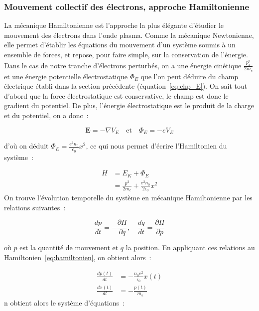 \documentclass[a4paper]{book}
\begin{document}
\subsubsection{Mouvement collectif des électrons, approche Hamiltonienne}

La mécanique Hamiltonienne est l'approche la plus élégante d'étudier le mouvement des électrons dans l'onde plasma. Comme la mécanique Newtonienne, elle permet d'établir les équations du mouvement d'un système soumis à un ensemble de forces, et repose, pour faire simple, sur la conservation de l'énergie. Dans le cas de notre tranche d'électrons perturbés, on a une énergie cinétique $\frac{p_x^2}{2m_e}$ et une énergie potentielle électrostatique $\Phi_E$ que l'on peut déduire du champ électrique établi dans la section précédente (équation~\ref{eq:chp_E}). On sait tout d'abord que la force électrostatique est conservative, le champ est donc le gradient du potentiel. De plus, l'énergie électrostatique est le produit de la charge et du potentiel, on a donc~:

\begin{equation}
    \textbf{E}=-\nabla V_E \quad \mathrm{et} \quad \Phi_E=-eV_E
\end{equation}

d'où on déduit $\Phi_E=\frac{e^2n_0}{\epsilon_0}x^2$, ce qui nous permet d'écrire l'Hamiltonien du système~:

\begin{align}
    H &= E_K + \Phi_E \\
      &= \frac{p^2}{2m_e}+\frac{e^2n_0}{2\epsilon_0}x^2
      \label{eq:hamiltonien}
\end{align}
On trouve l'évolution temporelle du système en mécanique Hamiltonienne par les relations suivantes~:

\begin{equation}
    \frac{dp}{dt}=-\frac{\partial H}{\partial q}, \quad \frac{dq}{dt}=\frac{\partial H}{\partial p}
\end{equation}

où $p$ est la quantité de mouvement et $q$ la position. En appliquant ces relations au Hamiltonien~\ref{eq:hamiltonien}, on obtient alors~:

\begin{eqnarray}
        \frac{dp(t)}{dt}&=-\frac{n_0e^2}{\epsilon_0}x(t)\\
        \frac{dx(t)}{dt}&=-\frac{p(t)}{m_e}
\end{eqnarray}
n obtient alors le système d'équations~:
\end{document}
